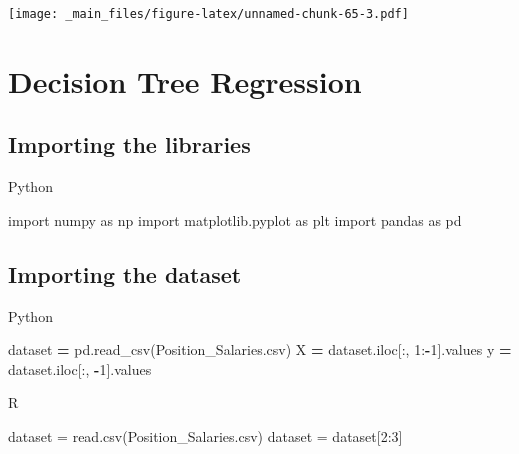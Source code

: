 \documentclass[
]{book}
\newenvironment{Shaded}{\begin{snugshade}}{\end{snugshade}}
\newcommand{\DecValTok}[1]{\textcolor[rgb]{0.00,0.00,0.81}{#1}}
\newcommand{\FunctionTok}[1]{\textcolor[rgb]{0.00,0.00,0.00}{#1}}
\newcommand{\ImportTok}[1]{#1}
\newcommand{\NormalTok}[1]{#1}
\newcommand{\OperatorTok}[1]{\textcolor[rgb]{0.81,0.36,0.00}{\textbf{#1}}}
\newcommand{\OtherTok}[1]{\textcolor[rgb]{0.56,0.35,0.01}{#1}}
\newcommand{\SpecialCharTok}[1]{\textcolor[rgb]{0.00,0.00,0.00}{#1}}
\newcommand{\StringTok}[1]{\textcolor[rgb]{0.31,0.60,0.02}{#1}}
\theoremstyle{definition}
\theoremstyle{definition}
\theoremstyle{definition}
\theoremstyle{definition}
\theoremstyle{remark}
\begin{document}
\texttt{[image: \_main\_files/figure-latex/unnamed-chunk-65-3.pdf]}

\hypertarget{decision-tree-regression}{%
\section{Decision Tree Regression}\label{decision-tree-regression}}

\hypertarget{importing-the-libraries-5}{%
\subsection{Importing the libraries}\label{importing-the-libraries-5}}

Python

\begin{Shaded}
\begin{Highlighting}[]
\ImportTok{import}\NormalTok{ numpy }\ImportTok{as}\NormalTok{ np}
\ImportTok{import}\NormalTok{ matplotlib.pyplot }\ImportTok{as}\NormalTok{ plt}
\ImportTok{import}\NormalTok{ pandas }\ImportTok{as}\NormalTok{ pd}
\end{Highlighting}
\end{Shaded}

\hypertarget{importing-the-dataset-5}{%
\subsection{Importing the dataset}\label{importing-the-dataset-5}}

Python

\begin{Shaded}
\begin{Highlighting}[]
\NormalTok{dataset }\OperatorTok{=}\NormalTok{ pd.read\_csv(}\StringTok{\textquotesingle{}Position\_Salaries.csv\textquotesingle{}}\NormalTok{)}
\NormalTok{X }\OperatorTok{=}\NormalTok{ dataset.iloc[:, }\DecValTok{1}\NormalTok{:}\OperatorTok{{-}}\DecValTok{1}\NormalTok{].values}
\NormalTok{y }\OperatorTok{=}\NormalTok{ dataset.iloc[:, }\OperatorTok{{-}}\DecValTok{1}\NormalTok{].values}
\end{Highlighting}
\end{Shaded}

R

\begin{Shaded}
\begin{Highlighting}[]
\NormalTok{dataset }\OtherTok{=} \FunctionTok{read.csv}\NormalTok{(}\StringTok{\textquotesingle{}Position\_Salaries.csv\textquotesingle{}}\NormalTok{)}
\NormalTok{dataset }\OtherTok{=}\NormalTok{ dataset[}\DecValTok{2}\SpecialCharTok{:}\DecValTok{3}\NormalTok{]}
\end{Highlighting}
\end{Shaded}
\end{document}
